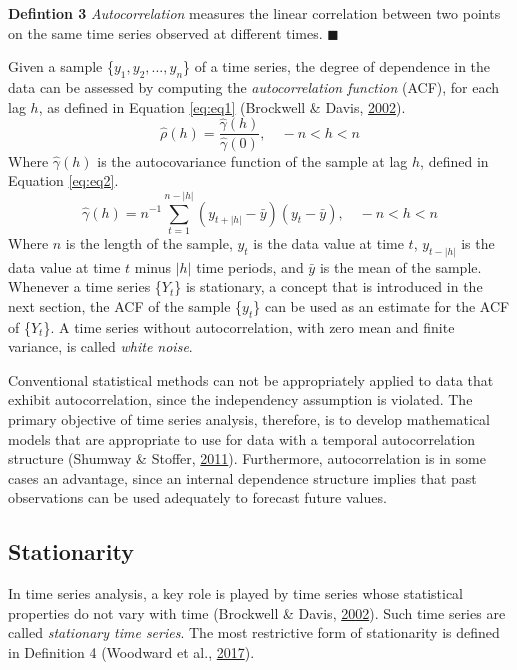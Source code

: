 \documentclass[12pt,oneside]{reedthesis}
\begin{document}
\textbf{Defintion 3} \emph{Autocorrelation} measures the linear
correlation between two points on the same time series observed at
different times. \(\blacksquare\)

Given a sample \{\(y_{1}, y_{2}, ... , y_{n}\)\} of a time series, the
degree of dependence in the data can be assessed by computing the
\emph{autocorrelation function} (ACF), for each lag \(h\), as defined in
Equation \eqref{eq:eq1} (Brockwell \& Davis,
\protect\hyperlink{ref-brockwell2002}{2002}).
\begin{equation}
\hat\rho(h) = \frac{\hat\gamma(h)}{\hat\gamma(0)}, \quad -n < h < n
\label{eq:eq1}
\end{equation}
Where \(\hat\gamma(h)\) is the autocovariance function of the sample at
lag \(h\), defined in Equation \eqref{eq:eq2}.
\begin{equation}
\hat\gamma(h) = n^{-1}\sum_{t=1}^{n-|h|}(y_{t+|h|} - \bar{y})(y_{t} - \bar{y}), \quad -n < h < n
\label{eq:eq2}
\end{equation}
Where \(n\) is the length of the sample, \(y_{t}\) is the data value at
time \(t\), \(y_{t-|h|}\) is the data value at time \(t\) minus \(|h|\)
time periods, and \(\bar{y}\) is the mean of the sample. Whenever a time
series \{\(Y_{t}\)\} is stationary, a concept that is introduced in the
next section, the ACF of the sample \{\(y_{t}\)\} can be used as an
estimate for the ACF of \{\(Y_{t}\)\}. A time series without
autocorrelation, with zero mean and finite variance, is called
\emph{white noise}.

Conventional statistical methods can not be appropriately applied to
data that exhibit autocorrelation, since the independency assumption is
violated. The primary objective of time series analysis, therefore, is
to develop mathematical models that are appropriate to use for data with
a temporal autocorrelation structure (Shumway \& Stoffer,
\protect\hyperlink{ref-shumway2011}{2011}). Furthermore, autocorrelation
is in some cases an advantage, since an internal dependence structure
implies that past observations can be used adequately to forecast future
values.

\subsection{Stationarity}\label{stationarity}

In time series analysis, a key role is played by time series whose
statistical properties do not vary with time (Brockwell \& Davis,
\protect\hyperlink{ref-brockwell2002}{2002}). Such time series are
called \emph{stationary time series}. The most restrictive form of
stationarity is defined in Definition 4 (Woodward et al.,
\protect\hyperlink{ref-woodward2017}{2017}).
\end{document}
